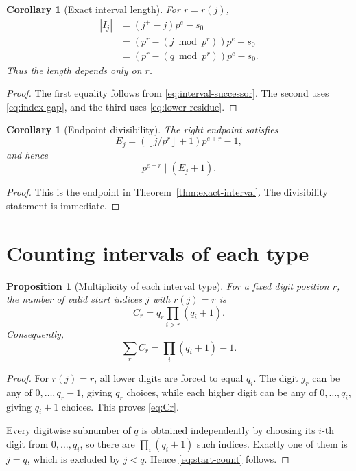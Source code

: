 \documentclass[11pt,a4paper]{article}
\newtheorem{proposition}[theorem]{Proposition}
\newtheorem{corollary}[theorem]{Corollary}
\theoremstyle{definition}
\theoremstyle{remark}
\newcommand{\floor}[1]{\left\lfloor #1\right\rfloor}
\begin{document}
\begin{corollary}[Exact interval length]
\label{cor:length}
For $r=r(j)$,
\begin{align}
 |I_j|
 &= (j^+-j)p^e-s_0\\
 &=\boxed{
 \left(p^r-(j\bmod p^r)\right)p^e-s_0
 }\\
 &=\boxed{
 \left(p^r-(q\bmod p^r)\right)p^e-s_0
 }.
 \label{eq:length-r-only}
\end{align}
Thus the length depends only on $r$.
\end{corollary}

\begin{proof}
The first equality follows from \eqref{eq:interval-successor}.  The second uses \eqref{eq:index-gap}, and the third uses \eqref{eq:lower-residue}.
\end{proof}

\begin{corollary}[Endpoint divisibility]
\label{cor:endpoint}
The right endpoint satisfies
\begin{equation}
\boxed{
 E_j=\left(\floor{j/p^r}+1\right)p^{e+r}-1,
}
\end{equation}
and hence
\begin{equation}
\boxed{p^{e+r}\mid(E_j+1).}
\end{equation}
\end{corollary}

\begin{proof}
This is the endpoint in Theorem~\ref{thm:exact-interval}.  The divisibility statement is immediate.
\end{proof}

\section{Counting intervals of each type}

\begin{proposition}[Multiplicity of each interval type]
\label{prop:type-count}
For a fixed digit position $r$, the number of valid start indices $j$ with $r(j)=r$ is
\begin{equation}
\boxed{
 C_r=q_r\prod_{i>r}(q_i+1).
}
\label{eq:Cr}
\end{equation}
Consequently,
\begin{equation}
\boxed{
\sum_r C_r=\prod_i(q_i+1)-1.
}
\label{eq:start-count}
\end{equation}
\end{proposition}

\begin{proof}
For $r(j)=r$, all lower digits are forced to equal $q_i$.  The digit $j_r$ can be any of $0,\ldots,q_r-1$, giving $q_r$ choices, while each higher digit can be any of $0,\ldots,q_i$, giving $q_i+1$ choices.  This proves \eqref{eq:Cr}.

Every digitwise subnumber of $q$ is obtained independently by choosing its $i$-th digit from $0,\ldots,q_i$, so there are $\prod_i(q_i+1)$ such indices.  Exactly one of them is $j=q$, which is excluded by $j<q$.  Hence \eqref{eq:start-count} follows.
\end{proof}
\end{document}
